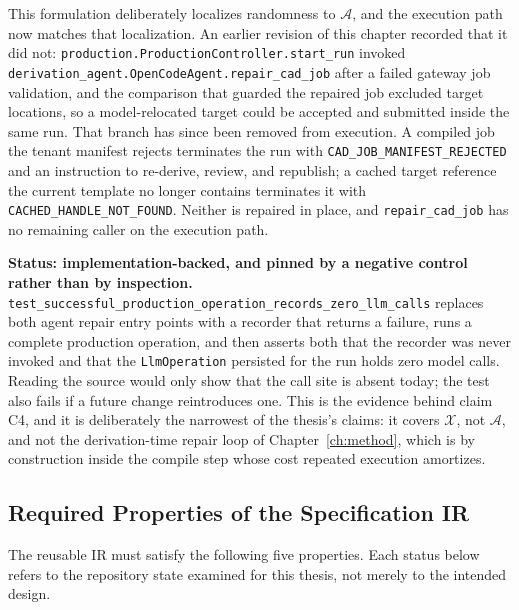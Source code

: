 This formulation deliberately localizes randomness to $\mathcal{A}$, and the execution
path now matches that localization. An earlier revision of this chapter recorded that it
did not: \texttt{production.ProductionController.start\_run} invoked
\texttt{derivation\_agent.OpenCodeAgent.repair\_cad\_job} after a failed gateway job
validation, and the comparison that guarded the repaired job excluded target locations,
so a model-relocated target could be accepted and submitted inside the same run. That
branch has since been removed from execution. A compiled job the tenant manifest rejects
terminates the run with \texttt{CAD\_JOB\_MANIFEST\_REJECTED} and an instruction to
re-derive, review, and republish; a cached target reference the current template no
longer contains terminates it with \texttt{CACHED\_HANDLE\_NOT\_FOUND}. Neither is
repaired in place, and \texttt{repair\_cad\_job} has no remaining caller on the execution
path.

\textbf{Status: implementation-backed, and pinned by a negative control rather than by
inspection.} \texttt{test\_successful\_production\_operation\_records\_zero\_llm\_calls}
replaces both agent repair entry points with a recorder that returns a failure, runs a
complete production operation, and then asserts both that the recorder was never invoked
and that the \texttt{LlmOperation} persisted for the run holds zero model calls. Reading
the source would only show that the call site is absent today; the test also fails if a
future change reintroduces one. This is the evidence behind claim C4, and it is
deliberately the narrowest of the thesis's claims: it covers $\mathcal{X}$, not
$\mathcal{A}$, and not the derivation-time repair loop of Chapter~\ref{ch:method}, which
is by construction inside the compile step whose cost repeated execution amortizes.

\subsection{Required Properties of the Specification IR}
\label{sec:design:properties}

The reusable IR must satisfy the following five properties. Each status below refers
to the repository state examined for this thesis, not merely to the intended design.


